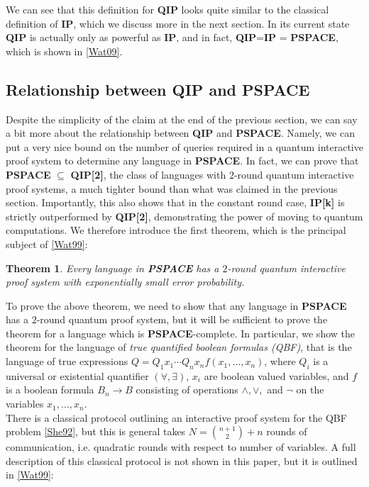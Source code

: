 \documentclass[12pt]{article}
\newtheorem{thm}{Theorem}
\numberwithin{thm}{section}
\numberwithin{defn}{section}
\numberwithin{prop}{section}
\numberwithin{rmk}{section}
\begin{document}
	We can see that this definition for \textbf{QIP} looks quite similar to the classical definition of \textbf{IP}, which we discuss more in the next section. In its current state \textbf{QIP} is actually only as powerful as \textbf{IP}, and in fact, \textbf{QIP}=\textbf{IP} = \textbf{PSPACE}, which is shown in \hyperref[wat09]{[Wat09]}. 
	\subsection{Relationship between QIP and PSPACE}
	Despite the simplicity of the claim at the end of the previous section, we can say a bit more about the relationship between \textbf{QIP} and \textbf{PSPACE}. Namely, we can put a very nice bound on the number of queries required in a quantum interactive proof system to determine any language in \textbf{PSPACE}. In fact, we can prove that \textbf{PSPACE} $\subseteq$ \textbf{QIP[2]}, the class of languages with $2$-round quantum interactive proof systems, a much tighter bound than what was claimed in the previous section. Importantly, this also shows that in the constant round case, \textbf{IP[k]} is strictly outperformed by \textbf{QIP[2]}, demonstrating the power of moving to quantum computations. We therefore introduce the first theorem, which is the principal subject of \hyperref[wat99]{[Wat99]}:
	
	\begin{thm}
		\label{thm1}
		Every language in \textbf{PSPACE} has a $2$-round quantum interactive proof system with exponentially small error probability. 
	\end{thm}
	
	
	To prove the above theorem, we need to show that any language in \textbf{PSPACE} has a $2$-round quantum proof system, but it will be sufficient to prove the theorem for a language which is \textbf{PSPACE}-complete. In particular, we show the theorem for the language of\textit{ true quantified boolean formulas (QBF)}, that is the language of true expressions $Q=Q_1x_1\cdots Q_nx_nf(x_1,\dots,x_n)$, where $Q_i$ is a universal or existential quantifier $(\forall,\exists)$, $x_i$ are boolean valued variables, and $f$ is a boolean formula $B_n\to B$ consisting of operations $\wedge,\vee,$ and $\neg$ on the variables $x_1,\dots,x_n$. \\
	
	There is a classical protocol outlining an interactive proof system for the QBF problem \hyperref[she92]{[She92]}, but this is general takes $N={{n+1}\choose{2}}+n$ rounds of communication, i.e. quadratic rounds with respect to number of variables. A full description of this classical protocol is not shown in this paper, but it is outlined in \hyperref[wat99]{[Wat99]}:
	
\end{document}
